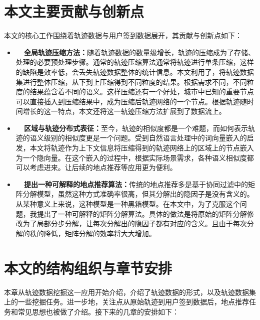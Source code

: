\section{本文主要贡献与创新点}
本文的核心工作围绕着轨迹数据与用户签到数据展开，其贡献与创新点如下：
\begin{itemize}
  \item \textbf{~~全局轨迹压缩方法：}随着轨迹数据的数量级增长，轨迹的压缩成为了存储、处理的必要预处理步骤。通常的轨迹压缩算法通常将轨迹进行单条压缩，这样的缺陷是效率低，会丢失轨迹数据整体的统计信息。本文利用了，将轨迹数据集进行整体压缩，从下到上压缩得到不同粒度的结果。根据需求不同，不同粒度的结果蕴含着不同的语义。这样压缩还有一个好处，城市中已知的重要节点可以直接插入到压缩结果中，成为压缩后轨迹网络的一个节点。根据轨迹随时间增长的这一特点，本文还将这一轨迹压缩方法扩展到了数据流上。
  \item \textbf{~~区域与轨迹分布式表征：}至今，轨迹的相似度都是一个难题，而如何表示轨迹的语义级别的相似度更是一个问题。受到自然语言处理中的词向量嵌入的启发，本文将轨迹作为上下文信息将压缩得到的轨迹网络上的区域上的节点嵌入为一个隐向量。在这个嵌入的过程中，根据实际场景需求，各种语义相似度都可以考虑进来。让后续的地点推荐等应用更为便利。
  \item \textbf{~~提出一种可解释的地点推荐算法：}传统的地点推荐多是基于协同过滤中的矩阵分解模型，虽然这种方式准确率很高，但其分解出的隐因子是没有含义的。从某种意义上来说，这种模型是一种黑箱模型。在本文中，为了克服这个问题，我提出了一种可解释的矩阵分解算法。具体的做法是将原始的矩阵分解修改为了局部分步分解，让每次分解出的隐因子都有对应的含义。且由于每次分解的秩的降低，矩阵分解的效率将大大增加。
\end{itemize}

\section{本文的结构组织与章节安排}
本章从轨迹数据挖掘这一应用开始介绍，介绍了轨迹数据的形式，以及轨迹数据集上的一些挖掘任务。进一步地，关注点从原始轨迹到用户签到数据后，地点推荐任务和常见思想也被做了介绍。接下来的几章的安排如下：

